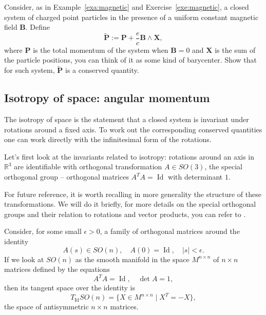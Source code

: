\documentclass[english,fontsize=11pt,paper=a5,oneside]{scrbook}
\newcommand{\R}{\mathbb{R}}
\DeclareMathOperator{\Id}{Id}
\theoremstyle{definition}
\newenvironment{exercise}
  {\pushQED{\qed}\renewcommand{\qedsymbol}{$\maltese$}\exercisex}
  {\popQED\endexercisex}
\begin{document}
\begin{exercise}
  Consider, as in Example~\ref{exa:magnetic} and Exercise~\ref{exe:magnetic}, a closed system of charged point particles in the presence of a uniform constant magnetic field $\bm{B}$. Define
  \begin{equation}
    \widetilde{\bm{P}} := \bm{P} + \frac{e}c \bm{B}\wedge \bm{X},
  \end{equation}
  where $\bm{P}$ is the total momentum of the system when $\bm{B} = 0$ and $\bm{X}$ is the sum of the particle positions, you can think of it as some kind of barycenter.
  Show that for such system, $\widetilde{\bm{P}}$ is a conserved quantity.
\end{exercise}

\subsection{Isotropy of space: angular momentum}\label{sec:angm}

The isotropy of space is the statement that a closed system is invariant under rotations around a fixed axis. To work out the corresponding conserved quantities one can work directly with the infinitesimal form of the rotations.

Let's first look at the invariants related to isotropy:
rotations around an axis in $\R^3$ are identifiable with orthogonal transformation $A\in SO(3)$, the special orthogonal group -- orthogonal matrices $A^TA = \Id$ with determinant $1$.

For future reference, it is worth recalling in more generality the structure of these transformations. We will do it briefly, for more details on the special orthogonal groups and their relation to rotations and vector products, you can refer to \cite{book:marsdenratiu}.

Consider, for some small $\epsilon > 0$, a family of orthogonal matrices around the identity
\begin{equation}\label{eq:familyson}
  A(s) \in SO(n), \quad A(0) = \Id, \quad |s| < \epsilon.
\end{equation}
If we look at $SO(n)$ as the smooth manifold in the space $M^{n\times n}$ of $n\times n$ matrices defined by the equations
\begin{equation}
  A^T A = \Id,\quad \det A = 1,
\end{equation}
then its tangent space over the identity is
\begin{equation}
  T_{\Id} SO(n) = \big\{X\in M^{n\times n}\mid X^T = -X\big\},
\end{equation}
the space of antisymmetric $n\times n$ matrices.
\end{document}
